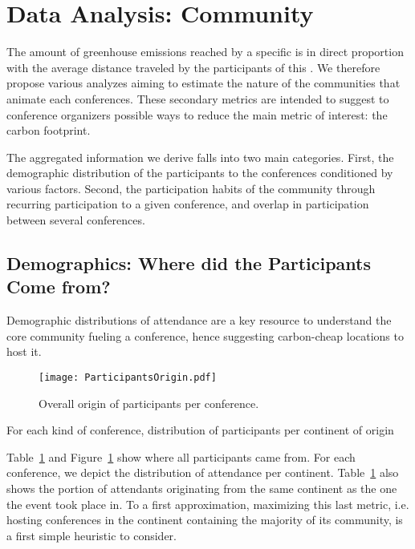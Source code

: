 \section{Data Analysis: Community}
\label{sec:community}

The amount of greenhouse emissions reached by a specific \event is in direct proportion with
the average distance traveled by the participants of this \event.
We therefore propose various analyzes aiming to estimate the nature of the
communities that animate each conferences. These secondary metrics are
intended to suggest to conference organizers possible ways to reduce the
main metric of interest: the carbon footprint. 

The aggregated information we derive falls into two main categories.
First, the demographic distribution of the participants to the conferences
conditioned by various factors.
Second, the participation habits of the community through recurring participation
to a given conference, and overlap in participation between several conferences.


\subsection{Demographics: Where did the Participants Come from?}
\label{subsec:demo}

Demographic distributions of attendance are a key resource to understand
the core community fueling a conference, hence suggesting carbon-cheap locations
to host it.

\begin{figure}
  \centering
  \texttt{[image: ParticipantsOrigin.pdf]}
  \caption{Overall origin of participants per conference.}
  \label{fig:demo-per-conf}
\end{figure}

\begin{table}
\caption{For each kind of conference, distribution of participants per continent of origin}
\label{table:demo-per-conf}
\end{table}


Table~\ref{fig:demo-per-conf} and Figure~\ref{fig:demo-per-conf} show where all
participants came from. For each conference, we depict the distribution of
attendance per continent. Table~\ref{fig:demo-per-conf} also shows the portion
of attendants originating from the same continent as the one the event took
place in. To a first approximation, maximizing this last metric, i.e. hosting
conferences in the continent containing the majority of its community, is a
first simple heuristic to consider.


